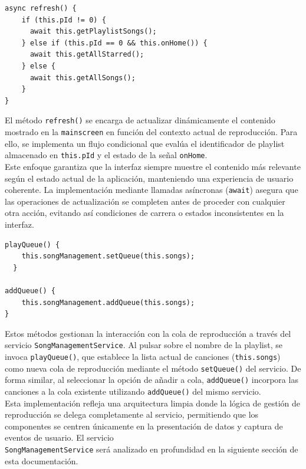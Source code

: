 \documentclass[11pt, a4paper]{article}
\begin{document}
                \begin{lstlisting}[caption={refresh()}]
async refresh() {
    if (this.pId != 0) {
      await this.getPlaylistSongs();
    } else if (this.pId == 0 && this.onHome()) {
      await this.getAllStarred();
    } else {
      await this.getAllSongs();
    }
}
                \end{lstlisting}

                El método \texttt{refresh()} se encarga de actualizar dinámicamente el contenido mostrado en la \texttt{mainscreen} en función del contexto actual de reproducción. Para ello, se implementa un flujo condicional que evalúa el identificador de playlist almacenado en \texttt{this.pId} y el estado de la señal \texttt{onHome}. \\

                Este enfoque garantiza que la interfaz siempre muestre el contenido más relevante según el estado actual de la aplicación, manteniendo una experiencia de usuario coherente. La implementación mediante llamadas asíncronas (\texttt{await}) asegura que las operaciones de actualización se completen antes de proceder con cualquier otra acción, evitando así condiciones de carrera o estados inconsistentes en la interfaz.

                \begin{lstlisting}[caption={playQueue() y addQueue()}]
playQueue() {
    this.songManagement.setQueue(this.songs);
  }

addQueue() {
    this.songManagement.addQueue(this.songs);
}
                \end{lstlisting}

                Estos métodos gestionan la interacción con la cola de reproducción a través del servicio \texttt{SongManagementService}. Al pulsar sobre el nombre de la playlist, se invoca \texttt{playQueue()}, que establece la lista actual de canciones (\texttt{this.songs}) como nueva cola de reproducción mediante el método \texttt{setQueue()} del servicio. De forma similar, al seleccionar la opción de añadir a cola, \texttt{addQueue()} incorpora las canciones a la cola existente utilizando \texttt{addQueue()} del mismo servicio. \\

                Esta implementación refleja una arquitectura limpia donde la lógica de gestión de reproducción se delega completamente al servicio, permitiendo que los componentes se centren únicamente en la presentación de datos y captura de eventos de usuario. El servicio \\ \texttt{SongManagementService} será analizado en profundidad en la siguiente sección de esta documentación.
\end{document}
